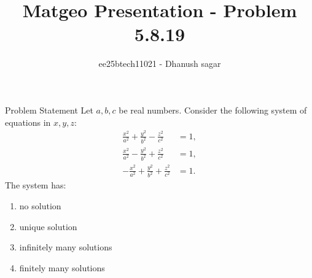 \documentclass{beamer}
\title{Matgeo Presentation - Problem 5.8.19}
\author{ee25btech11021 - Dhanush sagar}
\numberwithin{equation}{section}
\theoremstyle{remark}
\begin{document}
	

		




\begin{frame}
  \titlepage
\end{frame}

\begin{frame}{Problem Statement}
Let $a, b, c$ be real numbers. Consider the following system of equations in $x, y, z$:
\begin{align*}
\frac{x^2}{a^2} + \frac{y^2}{b^2} - \frac{z^2}{c^2} &= 1, \\
\frac{x^2}{a^2} - \frac{y^2}{b^2} + \frac{z^2}{c^2} &= 1, \\
-\frac{x^2}{a^2} + \frac{y^2}{b^2} + \frac{z^2}{c^2} &= 1.
\end{align*}
The system has:
\begin{enumerate}
    \item no solution
    \item unique solution
    \item infinitely many solutions
    \item finitely many solutions
\end{enumerate}
\end{frame}
\end{document}
